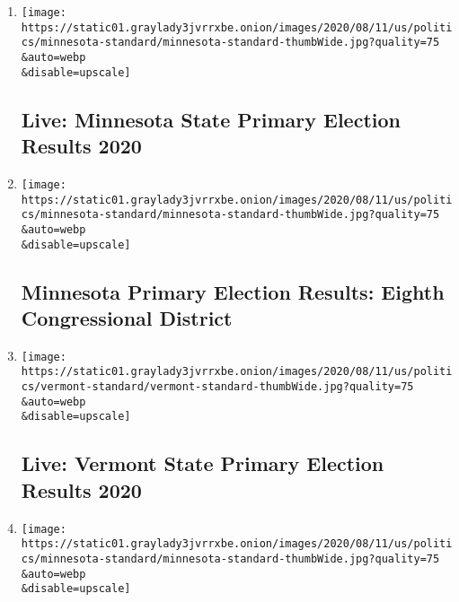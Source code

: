 \begin{enumerate}
\def\labelenumi{\arabic{enumi}.}
\item
  \href{/interactive/2020/08/11/us/elections/results-minnesota-primary-elections.html}{}

  \texttt{[image: https://static01.graylady3jvrrxbe.onion/images/2020/08/11/us/politics/minnesota-standard/minnesota-standard-thumbWide.jpg?quality=75\\\&auto=webp\\\&disable=upscale]}

  \hypertarget{live-minnesota-state-primary-election-results-2020}{%
  \subsection{Live: Minnesota State Primary Election Results
  2020}\label{live-minnesota-state-primary-election-results-2020}}
\item
  \href{/interactive/2020/08/11/us/elections/results-minnesota-house-district-8-primary-election.html}{}

  \texttt{[image: https://static01.graylady3jvrrxbe.onion/images/2020/08/11/us/politics/minnesota-standard/minnesota-standard-thumbWide.jpg?quality=75\\\&auto=webp\\\&disable=upscale]}

  \hypertarget{minnesota-primary-election-results-eighth-congressional-district}{%
  \subsection{Minnesota Primary Election Results: Eighth Congressional
  District}\label{minnesota-primary-election-results-eighth-congressional-district}}
\item
  \href{/interactive/2020/08/11/us/elections/results-vermont-primary-elections.html}{}

  \texttt{[image: https://static01.graylady3jvrrxbe.onion/images/2020/08/11/us/politics/vermont-standard/vermont-standard-thumbWide.jpg?quality=75\\\&auto=webp\\\&disable=upscale]}

  \hypertarget{live-vermont-state-primary-election-results-2020}{%
  \subsection{Live: Vermont State Primary Election Results
  2020}\label{live-vermont-state-primary-election-results-2020}}
\item
  \href{/interactive/2020/08/11/us/elections/results-minnesota-house-district-3-primary-election.html}{}

  \texttt{[image: https://static01.graylady3jvrrxbe.onion/images/2020/08/11/us/politics/minnesota-standard/minnesota-standard-thumbWide.jpg?quality=75\\\&auto=webp\\\&disable=upscale]}


\end{enumerate}
